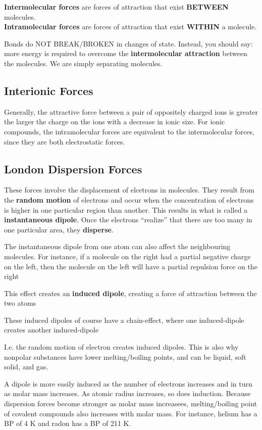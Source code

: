 \textbf{Intermolecular forces} are forces of attraction that exist \textbf{BETWEEN} molecules.\\
\textbf{Intramolecular forces} are forces of attraction that exist \textbf{WITHIN} a molecule.
\begin{important}
    Bonds do NOT BREAK/BROKEN in changes of state. Instead, you should say: more energy is required
    to overcome the \textbf{intermolecular attraction} between the molecules. We are simply separating
    molecules.
\end{important}

\subsection{Interionic Forces}
Generally, the attractive force between a pair of oppositely charged ions is greater the larger the
charge on the ions with a decrease in ionic size. For ionic compounds, the intramolecular forces
are equivalent to the intermolecular forces, since they are both electrostatic forces.

\subsection{London Dispersion Forces}
These forces involve the displacement of elcetrons in molecules. They result from the \textbf{random motion}
of electrons and occur when the concentration of electrons is higher in one particular region than
another. This results in what is called a \textbf{instantaneous dipole}. Once the electrons ``realize''
that there are too many in one particular area, they \textbf{disperse}.
\begin{bulleted-list}
    \item The instantaneous dipole from one atom can also affect the neighbouring molecules. For instance,
        if a molecule on the right had a partial negative charge on the left, then the molecule
        on the left will have a partial repulsion force on the right
    \item This effect creates an \textbf{induced dipole}, creating a force of attraction between
        the two atoms
    \item These induced dipoles of course have a chain-effect, where one induced-dipole creates
        another induced-dipole
    \item I.e. the random motion of electron creates induced dipoles. This is also why nonpolar
        substances have lower melting/boiling points, and can be liquid, soft solid, and gas.
\end{bulleted-list}
\begin{important}
    A dipole is more easily induced as the number of electrons increases and in turn as molar mass increases.
    As atomic radius increases, so does induction. Because dispersion forces become stronger as
    molar mass increasees, melting/boiling point of covalent compounds also increases with molar
    mass. For instance, helium has a BP of 4 K and radon has a BP of 211 K.
\end{important}

